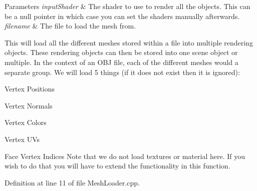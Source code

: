 \begin{DoxyParams}{Parameters}
{\em input\+Shader} & The shader to use to render all the objects. This can be a null pointer in which case you can set the shaders manually afterwards. \\
\hline
{\em filename} & The file to load the mesh from.\\
\hline
\end{DoxyParams}
This will load all the different meshes stored within a file into multiple rendering objects. These rendering objects can then be stored into one scene object or multiple. In the context of an O\+B\+J file, each of the different meshes would a separate group. We will load 5 things (if it does not exist then it is ignored)\+:
\begin{DoxyItemize}
\item Vertex Positions
\item Vertex Normals
\item Vertex Colors
\item Vertex U\+Vs
\item Face Vertex Indices Note that we do not load textures or material here. If you wish to do that you will have to extend the functionality in this function. 
\end{DoxyItemize}

Definition at line 11 of file Mesh\+Loader.\+cpp.


